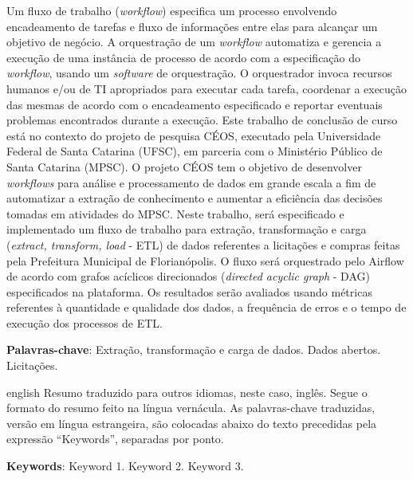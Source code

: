 \setlength{\absparsep}{18pt} %
\begin{resumo}
	\SingleSpacing
Um fluxo de trabalho (\textit{workflow}) especifica um processo envolvendo encadeamento de tarefas e fluxo de informações entre elas para alcançar um objetivo de negócio. A orquestração de um \textit{workflow} automatiza e gerencia a execução de uma instância de processo de acordo com a especificação do \textit{workflow}, usando um \textit{software} de orquestração. O orquestrador invoca recursos humanos e/ou de TI apropriados para executar cada tarefa, coordenar a execução das mesmas de acordo com o encadeamento especificado e reportar eventuais problemas encontrados durante a execução. Este trabalho de conclusão de curso está no contexto do projeto de pesquisa CÉOS, executado pela Universidade Federal de Santa Catarina (UFSC), em parceria com o Ministério Público de Santa Catarina (MPSC). O projeto CÉOS tem o objetivo de desenvolver \textit{workflows} para análise e processamento de dados em grande escala a fim de automatizar a extração de conhecimento e aumentar a eficiência das decisões tomadas em atividades do MPSC. Neste trabalho, será especificado e implementado um fluxo de trabalho para extração, transformação e carga (\textit{extract, transform, load} - ETL) de dados referentes a licitações e compras feitas pela Prefeitura Municipal de Florianópolis. O fluxo será orquestrado pelo Airflow de acordo com grafos acíclicos direcionados (\textit{directed acyclic graph} - DAG) especificados na plataforma. Os resultados serão avaliados usando métricas referentes à quantidade e qualidade dos dados, a frequência de erros e o tempo de execução dos processos de ETL.
	
	\textbf{Palavras-chave}: Extração, transformação e carga de dados. Dados abertos. Licitações.
\end{resumo}

\begin{resumo}[Abstract]
	\SingleSpacing
	\begin{otherlanguage*}{english}
		Resumo traduzido para outros idiomas, neste caso, inglês. Segue o formato do resumo feito na língua vernácula. As palavras-chave traduzidas, versão em língua estrangeira, são colocadas abaixo do texto precedidas pela expressão “Keywords”, separadas por ponto.
		
		\textbf{Keywords}: Keyword 1. Keyword 2. Keyword 3.
	\end{otherlanguage*}
\end{resumo}

